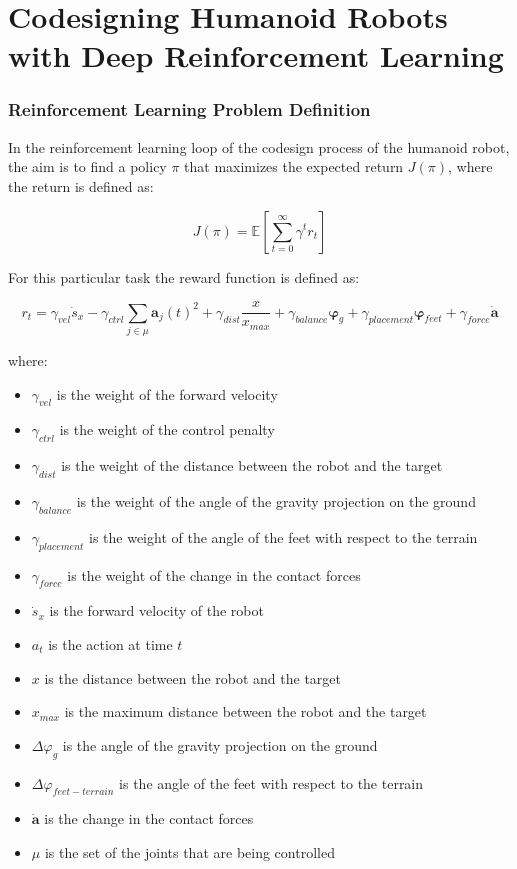 \chapter{Codesigning Humanoid Robots with Deep Reinforcement Learning}
\label{chp:contrib_CodesignRL}

\subsection{Reinforcement Learning Problem Definition}

In the reinforcement learning loop of the codesign process of the humanoid robot, the aim is to find a policy $\pi$ that maximizes the expected return $J(\pi)$, where the return is defined as:

\begin{equation}
    J(\pi) = \mathbb{E} \left[ \sum_{t=0}^{\infty} \gamma ^t r_t \right]
\end{equation}

For this particular task the reward function is defined as:

\begin{equation}
    r_t = \gamma_{vel} \dot{s}_x - \gamma_{ctrl}\sum _{j \in \mu} \mathbf{a}_j(t) ^2 + \gamma_{dist} \frac{x}{x_{max}} + \gamma_{balance} \boldsymbol{\varphi}_g + \gamma_{placement} \boldsymbol{\varphi}_{feet} + \gamma_{force} \mathbf{\dot{a}}
\end{equation}

where:

\begin{itemize}
    \item $\gamma_{vel}$ is the weight of the forward velocity
    \item $\gamma_{ctrl}$ is the weight of the control penalty
    \item $\gamma_{dist}$ is the weight of the distance between the robot and the target
    \item $\gamma_{balance}$ is the weight of the angle of the gravity projection on the ground
    \item $\gamma_{placement}$ is the weight of the angle of the feet with respect to the terrain
    \item $\gamma_{force}$ is the weight of the change in the contact forces
    \item $\dot{s}_x$ is the forward velocity of the robot
    \item $a_t$ is the action at time $t$
    \item $x$ is the distance between the robot and the target
    \item $x_{max}$ is the maximum distance between the robot and the target
    \item $\Delta \varphi_g$ is the angle of the gravity projection on the ground
    \item $\Delta \varphi_{feet - terrain}$ is the angle of the feet with respect to the terrain
    \item $\mathbf{\dot{a}}$ is the change in the contact forces
    \item $\mu$ is the set of the joints that are being controlled
\end{itemize}

